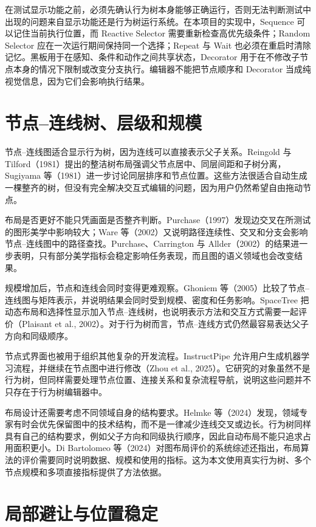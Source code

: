 \documentclass[11pt,a4paper,oneside,extrafontsizes]{memoir}
\begin{document}
在测试显示功能之前，必须先确认行为树本身能够正确运行，否则无法判断测试中出现的问题来自显示功能还是行为树运行系统。在本项目的实现中，Sequence 可以记住当前执行位置，而 Reactive Selector 需要重新检查高优先级条件；Random Selector 应在一次运行期间保持同一个选择；Repeat 与 Wait 也必须在重启时清除记忆。黑板用于在感知、条件和动作之间共享状态，Decorator 用于在不修改子节点本身的情况下限制或改变分支执行。编辑器不能把节点顺序和 Decorator 当成纯视觉信息，因为它们会影响执行结果。

\section{节点–连线树、层级和规模}

节点–连线图适合显示行为树，因为连线可以直接表示父子关系。Reingold 与 Tilford（1981）提出的整洁树布局强调父节点居中、同层间距和子树分离，Sugiyama 等（1981）进一步讨论同层排序和节点位置。这些方法很适合自动生成一棵整齐的树，但没有完全解决交互式编辑的问题，因为用户仍然希望自由拖动节点。

布局是否更好不能只凭画面是否整齐判断。Purchase（1997）发现边交叉在所测试的图形美学中影响较大；Ware 等（2002）又说明路径连续性、交叉和分支会影响节点–连线图中的路径查找。Purchase、Carrington 与 Allder（2002）的结果进一步表明，只有部分美学指标会稳定影响任务表现，而且图的语义领域也会改变结果。

规模增加后，节点和连线会同时变得更难观察。Ghoniem 等（2005）比较了节点–连线图与矩阵表示，并说明结果会同时受到规模、密度和任务影响。SpaceTree 把动态布局和选择性显示加入节点–连线树，也说明表示方法和交互方式需要一起评价（Plaisant et al., 2002）。对于行为树而言，节点–连线方式仍然最容易表达父子方向和同级顺序。

节点式界面也被用于组织其他复杂的开发流程。InstructPipe 允许用户生成机器学习流程，并继续在节点图中进行修改（Zhou et al., 2025）。它研究的对象虽然不是行为树，但同样需要处理节点位置、连接关系和复杂流程导航，说明这些问题并不只存在于行为树编辑器中。

布局设计还需要考虑不同领域自身的结构要求。Helmke 等（2024）发现，领域专家有时会优先保留图中的技术结构，而不是一律减少连线交叉或边长。行为树同样具有自己的结构要求，例如父子方向和同级执行顺序，因此自动布局不能只追求占用面积更小。Di Bartolomeo 等（2024）对图布局评价的系统综述还指出，布局算法的评价需要同时说明数据、规模和使用的指标。这为本文使用真实行为树、多个节点规模和多项直接指标提供了方法依据。

\section{局部避让与位置稳定}
\end{document}

